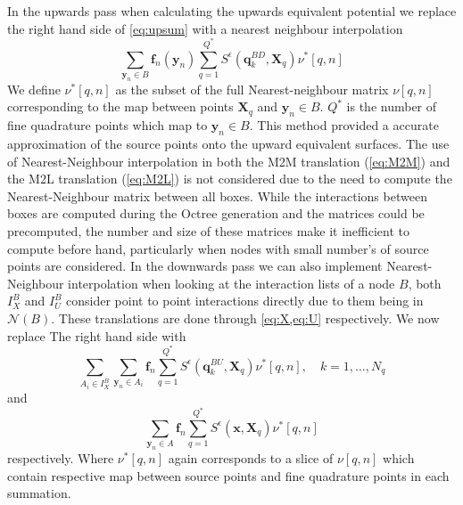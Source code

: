 In the upwards pass when calculating the upwards equivalent potential we replace the right hand side of \cref{eq:upsum} with a nearest neighbour interpolation
\begin{equation*}
    \sum_{{\bm{y}}_{n} \in B} \bm{f}_{n}({\bm{y}}_n) \sum_{q=1}^{Q^*}S^{\epsilon}\left({\bm{q}}^{BD}_{k}, {\bm{X}}_{q}\right) \nu^*[q,n]
\end{equation*}
We define $\nu^*[q,n]$ as the subset of the full Nearest-neighbour matrix $\nu[q,n]$ corresponding to the map between points ${\bm{X}}_{q}$ and ${\bm{y}}_{n} \in B$. $Q^*$ is the number of fine quadrature points which map to ${\bm{y}}_{n} \in B$. This method provided a accurate approximation of the source points onto the upward equivalent surfaces. The use of Nearest-Neighbour interpolation in both the M2M translation (\cref{eq:M2M}) and the M2L translation (\cref{eq:M2L}) is not considered due to the need to compute the Nearest-Neighbour matrix between all boxes. While the interactions between boxes are computed during the Octree generation and the matrices could be precomputed, the number and size of these matrices make it inefficient to compute before hand, particularly when nodes with small number's of source points are considered. 
In the downwards pass we can also implement Nearest-Neighbour interpolation when looking at the interaction lists of a node $B$, both $I_X^B$ and $I_U^B$ consider point to point interactions directly due to them being in $\mathcal{N}(B)$. These translations are done through \cref{eq:X,eq:U} respectively. We now replace The right hand side with 
\begin{equation*}
    \sum_{A_i \in I_X^B} \sum_{{\bm{y}}_n\in A_i} {\bm{f}}_{n} \sum_{q=1}^{Q^*} S^\epsilon\left(\bm{q}^{BU}_{k}, {\bm{X}}_{q}\right) \nu^*[q,n], \quad k=1,\dots,N_q
\end{equation*}
and
\begin{equation*}
    \sum_{{\bm{y}}_n\in A}{\bm{f}}_n \sum_{q=1}^{Q^*} S^\epsilon(\bm{x},{\bm{X}}_q) \nu^*[q,n]
\end{equation*}
respectively. Where $\nu^*[q,n]$ again corresponds to a slice of $\nu[q,n]$ which contain respective map between source points and fine quadrature points in each summation.